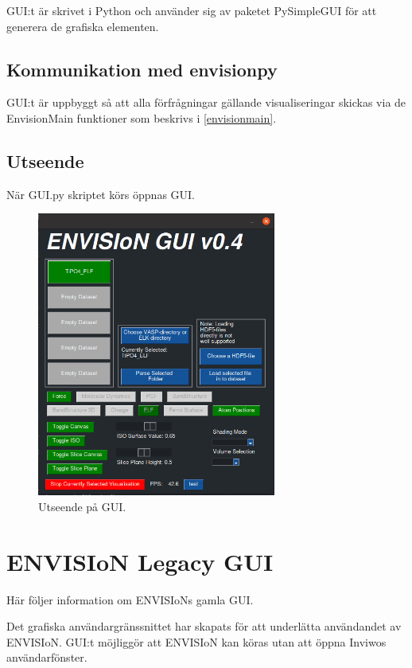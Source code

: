 \documentclass[10pt,oneside,swedish]{article}
\begin{document}
GUI:t är skrivet i Python och använder sig av paketet PySimpleGUI för att generera de grafiska elementen. 

\subsection{Kommunikation med envisionpy}
GUI:t är uppbyggt så att alla förfrågningar gällande visualiseringar skickas via de EnvisionMain funktioner som beskrivs i \ref{envisionmain}.

\subsection{Utseende}
När GUI.py skriptet körs öppnas GUI.
\begin{figure}[H]
\centering
\includegraphics[width=0.70000\textwidth]{Images/gui_look.PNG}
\caption{Utseende på GUI.}
\label{fig:Gui_look}
\end{figure}

\newpage
\section{ENVISIoN Legacy GUI}\label{gui-systemet}

Här följer information om ENVISIoNs gamla GUI.

Det grafiska användargränssnittet har skapats för att underlätta
användandet av ENVISIoN. GUI:t möjliggör att ENVISIoN kan köras utan att
öppna Inviwos användarfönster.
\end{document}
